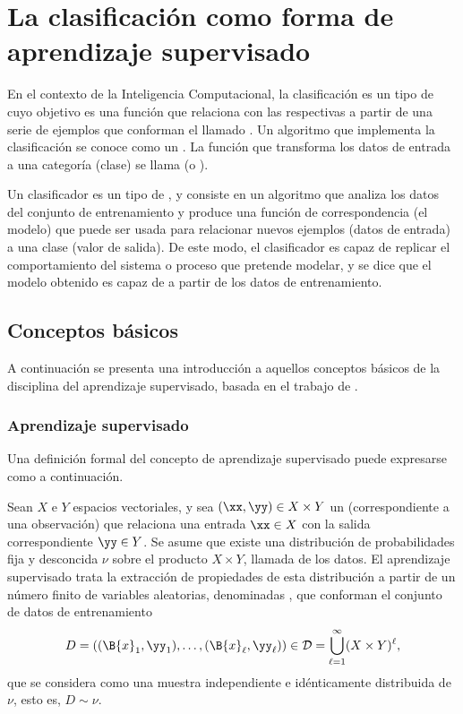%
%
%
\section{La clasificación como forma de aprendizaje supervisado}
%
En el contexto de la Inteligencia Computacional, la clasificación es
un tipo de  cuyo objetivo es
 una función que relaciona  con las
respectivas  a partir de una serie de ejemplos que
conforman el llamado .  Un algoritmo que
implementa la clasificación se conoce como un .
La función que transforma los datos de entrada a una categoría
(clase) se llama  (o ).

Un clasificador es un tipo de , y consiste
en un algoritmo que analiza los datos del conjunto de entrenamiento
y produce una función de correspondencia (el modelo) que puede ser
usada para relacionar nuevos ejemplos (datos de entrada) a una clase
(valor de salida).
De este modo, el clasificador es capaz de replicar el comportamiento
del sistema o proceso que pretende modelar, y se dice que el modelo
obtenido es capaz de  a partir de los datos de
entrenamiento.
%
%
\subsection{Conceptos básicos}
%
A continuación se presenta una introducción a aquellos conceptos
básicos de la disciplina del aprendizaje supervisado, basada en el
trabajo de \citeauthor{glasmachers} \cite{glasmachers}.
%
\subsubsection{Aprendizaje supervisado}
%
Una definición formal del concepto de aprendizaje supervisado
puede expresarse como a continuación.

Sean $X$ e $Y$ espacios vectoriales, y sea $(\xx,\yy)\in{}X\times{}Y$
un  (correspondiente a una observación) que relaciona una
entrada $\xx\in{}X$ con la salida correspondiente $\yy\in{}Y$.
%
Se asume que existe una distribución de probabilidades fija y
desconcida $\nu$ sobre el producto $X\times Y$, llamada
 de los datos.  El aprendizaje supervisado
trata la extracción de propiedades de esta distribución a partir de un
número finito de variables aleatorias, denominadas , que
conforman el conjunto de datos de entrenamiento
%
\begin{align}
  D = \left((\B{x}_1,\yy_1),\ldots,(\B{x}_\ell,\yy_\ell)\right) \in
  \mathcal{D}=\bigcup_{\ell=1}^\infty (X\times Y)^\ell,
\end{align}
%
que se considera como una muestra independiente e idénticamente
distribuida de $\nu$, esto es, $D\sim\nu$.
%
